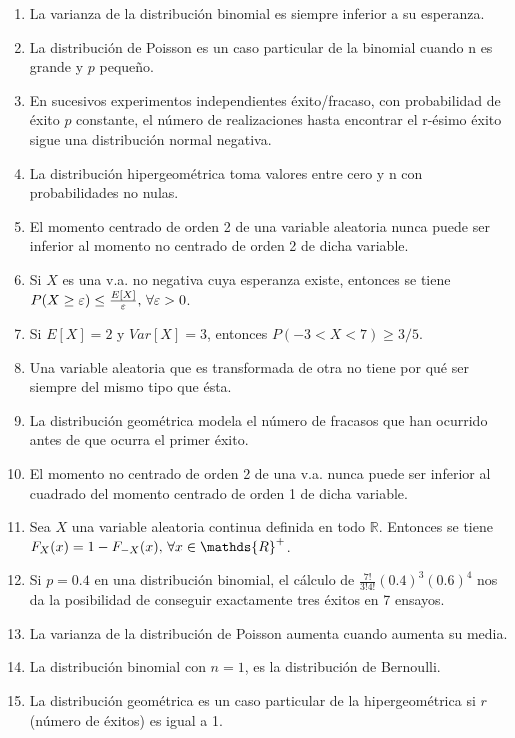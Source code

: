 \documentclass[fleqn]{article}
\def\R{\mathds{R}}
\begin{document}
\begin{enumerate}
                        \begin{enumerate}
                                \item La varianza de la distribución binomial es siempre inferior a su esperanza.
                                \item La distribución de Poisson es un caso particular de la binomial cuando n es grande y $p$ pequeño.
                                \item En sucesivos experimentos independientes éxito/fracaso, con probabilidad de éxito $p$ constante,
                                        el número de realizaciones hasta encontrar el r-ésimo éxito sigue una distribución normal negativa.
                                \item La distribución hipergeométrica toma valores entre cero y n con probabilidades no nulas.
                                \item El momento centrado de orden 2 de una variable aleatoria nunca puede ser inferior al momento no centrado
                                        de orden 2 de dicha variable.
                                \item Si $X$ es una v.a. no negativa cuya esperanza existe, entonces se tiene
                                        $P(X\geq \varepsilon) \leq \frac{E[X]}{\varepsilon}, \thinspace \forall \varepsilon >0$.
                                \item Si $E[X] = 2$ y $Var[X] = 3$, entonces $P(-3 < X < 7) \geq 3/5$.
                                \item Una variable aleatoria que es transformada de otra no tiene por qué ser siempre del mismo tipo que ésta.
                                \item La distribución geométrica modela el número de fracasos que han ocurrido antes de que ocurra el primer éxito.
                                \item El momento no centrado de orden 2 de una v.a. nunca puede ser inferior al cuadrado del momento centrado de 
                                        orden 1 de dicha variable.
                                \item Sea $X$ una variable aleatoria continua definida en todo $\R$. Entonces se tiene 
                                        $F_X (x) = 1 - F_{-X} (x), \thinspace \forall x \in \R^+$.
                                \item Si $p=0.4$ en una distribución binomial, el cálculo de $\frac{7!}{3! 4!} (0.4)^3 (0.6)^4$ nos da la posibilidad 
                                        de conseguir exactamente tres éxitos en 7 ensayos.
                                \item La varianza de la distribución de Poisson aumenta cuando aumenta su media.
                                \item La distribución binomial con $n=1$, es la distribución de Bernoulli.
                                \item La distribución geométrica es un caso particular de la hipergeométrica si $r$ (número de éxitos) es igual a 1.
                        \end{enumerate}
                


\end{enumerate}
\end{document}
